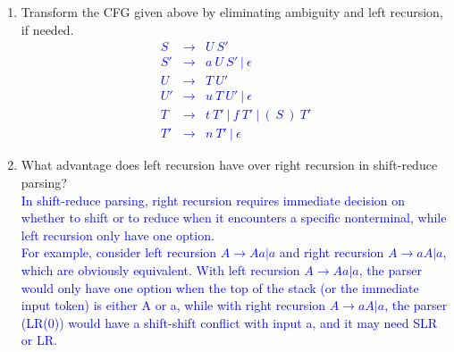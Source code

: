 \documentclass[10pt]{exam}
\begin{document}
\begin{enumerate}
\begin{enumerate}
{
                }
          \item Transform the CFG given above by eliminating ambiguity and
                left recursion, if needed.
                \textcolor{blue}{\[\begin{array}{cll}
                      S  & \rightarrow & U\ S'                           \\
                      S' & \rightarrow & a\ U\ S'\ |\ \epsilon           \\
                      U  & \rightarrow & T\ U'                           \\
                      U' & \rightarrow & u\ T\ U'\ |\ \epsilon           \\
                      T  & \rightarrow & t\ T'\ |\ f\ T'\ |\ (\ S\ )\ T' \\
                      T' & \rightarrow & n\ T'\ |\ \epsilon
                    \end{array}\]}
          \item What advantage does left recursion have over right recursion in shift-reduce parsing?\\
                \textcolor{blue}{
                  In shift-reduce parsing, right recursion requires immediate decision on whether to shift or to reduce when it encounters a specific nonterminal,
                  while left recursion only have one option. \\
                  For example, consider left recursion $A\rightarrow Aa|a$ and right recursion $A\rightarrow aA|a$,
                  which are obviously equivalent. With left recursion $A\rightarrow Aa|a$, the parser would only have one option when the top of the stack (or the immediate input token) is either A or a, while with right recursion $A\rightarrow aA|a$,
                  the parser (LR(0)) would have a shift-shift conflict with input a, and it may need SLR or LR.
                }
        \end{enumerate}


\end{enumerate}
\end{document}
